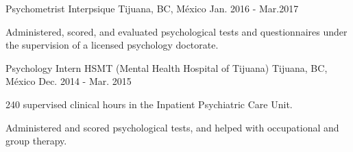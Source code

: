 \begin{cventries}
    \cventry
        {Psychometrist}
        {Interpsique}
        {Tijuana, BC, México}
        {Jan. 2016 - Mar.2017}
        {
            \begin{cvitems}
                \item {Administered, scored, and evaluated psychological tests and questionnaires under the supervision of a licensed psychology doctorate.}
            \end{cvitems}
        }
    \cventry
        {Psychology Intern}
        {HSMT (Mental Health Hospital of Tijuana)}
        {Tijuana, BC, México}
        {Dec. 2014 - Mar. 2015}
        {
            \begin{cvitems}
                \item {240 supervised clinical hours in the Inpatient Psychiatric Care Unit.}
                \item {Administered and scored psychological tests, and helped with occupational and group therapy.}
            \end{cvitems}
        }
\end{cventries}

